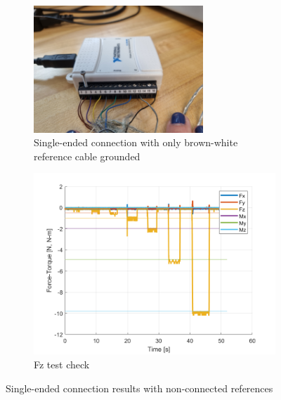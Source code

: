 \documentclass[a4paper]{article}
\begin{document}
\begin{figure}[h!]
	\begin{subfigure}{.5\textwidth}
		\centering
		\includegraphics[width=0.7\textwidth,angle=180]{NIUSB6008_ATIMini40Connection.jpg}
		\caption{Single-ended connection with only brown-white reference cable grounded}
		\label{fig:NIUSB6008_ATIMini40Connection}
	\end{subfigure}%
	\begin{subfigure}{.5\textwidth}
		\centering
		\includegraphics[width=.8\linewidth]{Forces_check50Hz.png}
		\caption{Fz test check}
		\label{fig:Forces_check50Hz}
	\end{subfigure}
	\caption{Single-ended connection results with non-connected references}
	\label{fig:test1}
\end{figure} 
\end{document}
